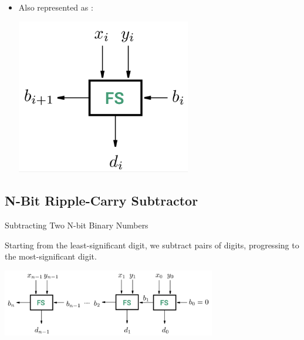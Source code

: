 \documentclass[12pt,openany]{book}
\begin{document}
\begin{itemize}
			      		\item[] Also represented as : 
			      		      \begin{center}
			      		      	\begin{minipage}[c]{0.60\textwidth} %
			      		      		\centering
			      		      		\includegraphics[width=0.60\textwidth]{circuits/8.2.4.png} %
			      		      	\end{minipage}
			      		      	  
			      		      \end{center}
			      	\end{itemize}
			      	
			      	\subsection{N-Bit Ripple-Carry Subtractor}
			      	Subtracting Two N-bit Binary Numbers
			      	
			      	Starting from the least-significant digit, we subtract pairs of digits, progressing to the most-significant digit.
			      	
			      	\begin{center}
			      		\begin{minipage}[c]{0.80\textwidth} %
			      			\centering
			      			\includegraphics[width=0.70\textwidth]{circuits/8.2.5.png} %
			      		\end{minipage}
			      		  
			      	\end{center}
			      	
\end{document}
